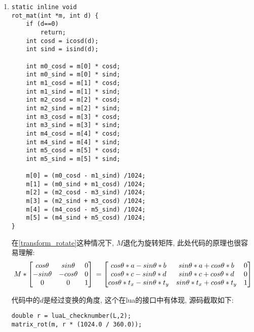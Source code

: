 {\begin {enumerate}
    \gaccobsplitinv

    \item { {}
\begin{lstlisting}[language={[ANSI]C}]
static inline void
rot_mat(int *m, int d) {
    if (d==0)
        return;
    int cosd = icosd(d);
    int sind = isind(d);

    int m0_cosd = m[0] * cosd;
    int m0_sind = m[0] * sind;
    int m1_cosd = m[1] * cosd;
    int m1_sind = m[1] * sind;
    int m2_cosd = m[2] * cosd;
    int m2_sind = m[2] * sind;
    int m3_cosd = m[3] * cosd;
    int m3_sind = m[3] * sind;
    int m4_cosd = m[4] * cosd;
    int m4_sind = m[4] * sind;
    int m5_cosd = m[5] * cosd;
    int m5_sind = m[5] * sind;

    m[0] = (m0_cosd - m1_sind) /1024;
    m[1] = (m0_sind + m1_cosd) /1024;
    m[2] = (m2_cosd - m3_sind) /1024;
    m[3] = (m2_sind + m3_cosd) /1024;
    m[4] = (m4_cosd - m5_sind) /1024;
    m[5] = (m4_sind + m5_cosd) /1024;
}
\end{lstlisting}

        在\eqref{transform_rotate}这种情况下, $M$退化为旋转矩阵, 此处代码的原理也很容易理解:
        \begin{equation}
            M *
            \begin{bmatrix}
                cos\theta  &  sin\theta  &   0\\
                -sin\theta &  -cos\theta &   0\\
                0          &  0          &   1
            \end{bmatrix}\\
            =
            \begin{bmatrix}
                cos\theta*a - sin\theta*b     & sin\theta*a + cos\theta*b     & 0\\
                cos\theta*c - sin\theta*d     & sin\theta*c + cos\theta*d     & 0\\
                cos\theta*t_x - sin\theta*t_y & sin\theta*t_x + cos\theta*t_y & 1
            \end{bmatrix}
        \end{equation}

        代码中的$d$是经过变换的角度, 这个在lua的接口中有体现, 源码截取如下:
\begin{lstlisting}[language={[ANSI]C}]
double r = luaL_checknumber(L,2);
matrix_rot(m, r * (1024.0 / 360.0));
\end{lstlisting}

}
\end{enumerate}}
